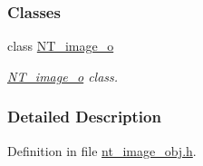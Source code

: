 \subsubsection*{Classes}
\begin{DoxyCompactItemize}
\item 
class \hyperlink{class_n_t__image__o}{NT\_\-image\_\-o}
\begin{DoxyCompactList}\small\item\em \hyperlink{class_n_t__image__o}{NT\_\-image\_\-o} class. \item\end{DoxyCompactList}\end{DoxyCompactItemize}


\subsubsection{Detailed Description}


Definition in file \hyperlink{nt__image__obj_8h_source}{nt\_\-image\_\-obj.h}.

